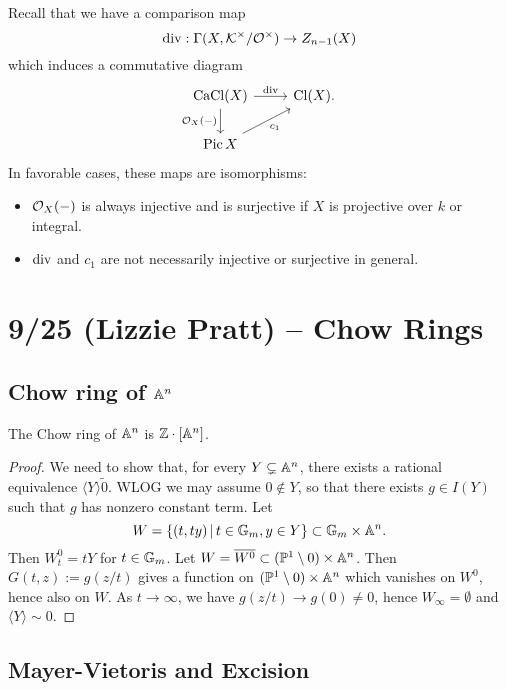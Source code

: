 \documentclass{article}
\begin{document}
Recall that we have a comparison map
\[
	\divop: \Gamma(X, \Kc^\times / \Oc^\times) \to Z_{n-1}(X)
\]
which induces a commutative diagram
\[
	\begin{tikzcd}
		\CaCl(X) \rar["\divop"] \dar["\Oc_X(-)", swap] & \Cl(X). \\
		\Pic X \ar[ur, "c_1", swap] &
	\end{tikzcd}
\]
In favorable cases, these maps are isomorphisms:
\begin{itemize}
	\item $\Oc_X(-)$ is always injective and is surjective if $X$ is projective over $k$ or integral.
	\item $\divop$ and $c_1$ are not necessarily injective or surjective in general.
\end{itemize}

\section{9/25 (Lizzie Pratt) -- Chow Rings}

\subsection{Chow ring of $\AA^n$}

\begin{prop}
	The Chow ring of $\AA^n$ is $\ZZ \cdot [\AA^n]$.
\end{prop}

\begin{proof}
	We need to show that, for every $Y \subsetneq \AA^n$, there exists a rational equivalence $\langle Y \rangle \tilde 0$.
	WLOG we may assume $0 \not\in Y$, so that there exists $g \in I(Y)$ such that $g$ has nonzero constant term.
	Let
	\[
		W = \{ (t, ty) \, | \, t \in \GG_m, y \in Y \} \subset \GG_m \times \AA^n.
	\]
	Then $W^0_t = t Y$ for $t \in \GG_m$.
	Let $W = \ol{W^0} \subset (\PP^1 \setminus 0) \times \AA^n$.
	Then $G(t, z) := g(z/t)$ gives a function on $(\PP^1 \setminus 0) \times \AA^n$ which vanishes on $W^0$, hence also on $W$.
	As $t \to \infty$, we have $g(z/t) \to g(0) \neq 0$, hence $W_\infty = \emptyset$ and $\langle Y \rangle \sim 0$.
\end{proof}

\subsection{Mayer-Vietoris and Excision}
\end{document}
